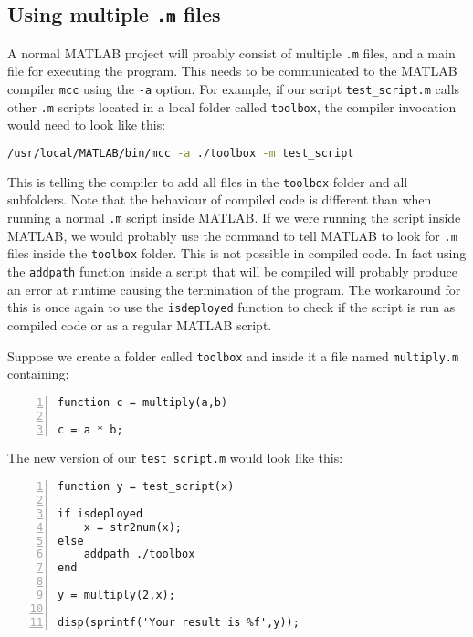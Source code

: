 \subsection{Using multiple \texttt{.m} files}

A normal MATLAB project will proably consist of multiple \texttt{.m} files, and
a main file for executing the program. This needs to be communicated to the
MATLAB compiler \texttt{mcc} using the \texttt{-a} option.  For example, if our
script \texttt{test\_script.m} calls other \texttt{.m} scripts located in a
local folder called \texttt{toolbox}, the compiler invocation would need to look like
this:

\begin{lstlisting}[language=bash]
/usr/local/MATLAB/bin/mcc -a ./toolbox -m test_script
\end{lstlisting}

This is telling the compiler to add all files in the \texttt{toolbox} folder and
all subfolders. Note that the behaviour of compiled code is different than when
running a normal \texttt{.m} script inside MATLAB. If we were running the script
inside MATLAB, we would probably use the command  to
tell MATLAB to look for \texttt{.m} files inside the \texttt{toolbox}
folder. This is not possible in compiled code. In fact using the
\texttt{addpath} function inside a script that will be compiled will probably
produce an error at runtime causing the termination of the program. The
workaround for this is once again to use the \texttt{isdeployed} function to
check if the script is run as compiled code or as a regular MATLAB script.

Suppose we create a folder called \texttt{toolbox} and inside it a file named \texttt{multiply.m} containing:

\begin{lstlisting}[numbers=left,title={\texttt{multiply.m}},captionpos=b]
function c = multiply(a,b)

c = a * b;
\end{lstlisting}

The new version of our \texttt{test\_script.m} would look like this:

\begin{lstlisting}[numbers=left,title={Third version of \texttt{test\_script.m}},captionpos=b]
function y = test_script(x)

if isdeployed
    x = str2num(x);
else
    addpath ./toolbox
end

y = multiply(2,x);

disp(sprintf('Your result is %f',y));
\end{lstlisting}

